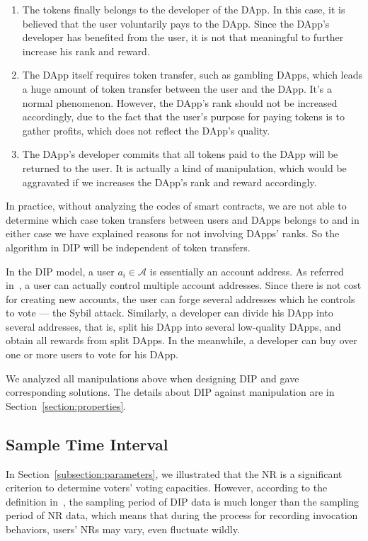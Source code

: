   \begin{enumerate}
  	 \item The tokens finally belongs to the developer of the DApp. In this case, it is believed that the user voluntarily pays to the DApp. Since the DApp's developer has benefited from the user, it is not that meaningful to further increase his rank and reward.
  	\item The DApp itself requires token transfer, such as gambling DApps, which leads  a huge amount of token transfer between the user and the DApp. It's a normal phenomenon. However, the DApp's rank should not be increased accordingly, due to the fact that the user's purpose for paying tokens is to gather profits, which does not reflect the DApp's quality.
   \item The DApp's developer commits that all tokens paid to the DApp will be returned to the user. It is actually a kind of manipulation, which would be aggravated if we increases the DApp's rank and reward accordingly.
  \end{enumerate}
  In practice, without analyzing the codes of smart contracts, we are not able to determine which case token transfers between users and DApps belongs to and in either case we have explained reasons for not involving DApps' ranks. So the algorithm in DIP will be independent of token transfers.

  In the DIP model, a user $a_i \in \mathcal{A}$ is essentially an account address. As referred in~\cite{Nebulasyellowpaper}, a user can actually control multiple account addresses. Since there is not cost for creating new accounts, the user can forge several addresses which he controls to vote --- the Sybil attack. Similarly, a developer can divide his DApp into several addresses, that is, split his DApp into several low-quality DApps, and obtain all rewards from split DApps. In the meanwhile, a developer can buy over one or more users to vote for his DApp.

  We analyzed all manipulations above when designing DIP and gave corresponding solutions. The details about DIP against manipulation are in Section~\ref{section:properties}.

  \subsection{Sample Time Interval}
  \label{subsection:interval}
  In Section~\ref{subsection:parameters}, we illustrated that the NR is a significant criterion to determine voters' voting capacities. However, according to the definition in~\cite{Nebulasyellowpaper}, the sampling period of DIP data is much longer than the sampling period of NR data, which means that during the process for recording invocation behaviors, users' NRs may vary, even fluctuate wildly.

